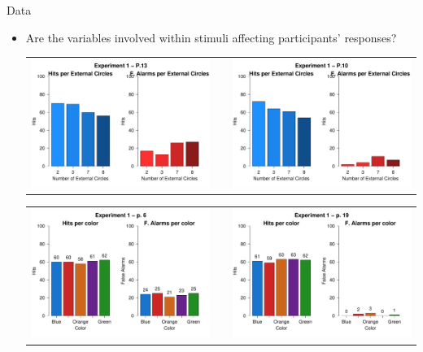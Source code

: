 \documentclass[final]{beamer}
\newlength{\onecolwid}
\newlength{\twocolwid}
\begin{document}
\begin{frame}[t]
\begin{columns}[t]
\begin{column}{\twocolwid}
\begin{columns}[t,totalwidth=\twocolwid]
\begin{column}{\onecolwid}
\begin{alertblock}{Data}
\begin{itemize}
\item Are the variables involved within stimuli affecting participants' responses?

\begin{center}
\begin{tabular}{ccc}
\includegraphics[width=0.42\linewidth]{Figures/7_ExternalC.pdf} & \hfill & \includegraphics[width=0.42\linewidth]{Figures/7_Cir.pdf} 
\end{tabular}
\end{center}


\begin{center}
\begin{tabular}{ccc}
\includegraphics[width=0.42\linewidth]{Figures/8_Color.pdf} & \hfill & \includegraphics[width=0.42\linewidth]{Figures/8_Color_.pdf}
\end{tabular}
\end{center}




\end{itemize}
\end{alertblock}
\end{column}
\end{columns}
\end{column}
\end{columns}
\end{frame}
\end{document}
